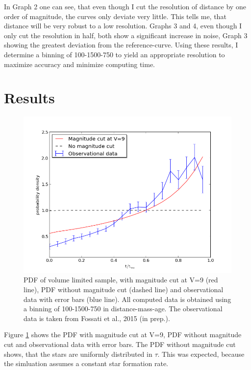 \documentclass[a4paper,10pt]{article}
\begin{document}
 In Graph 2 one can see, that even though I cut the resolution of distance by one order of magnitude, the curves only deviate very little. This
 tells me, that distance will be very robust to a low resolution. Graphs 3 and 4, even though I only cut the resolution in half, both 
 show a significant increase in noise, Graph 3 showing the greatest deviation from the reference-curve. Using these results, I determine 
 a binning of 100-1500-750 to yield an appropriate resolution to maximize accuracy and minimize computing time.
 
 \newpage
 \section{Results}
 \begin{figure}[h!]
   \includegraphics[width=\textwidth]{plot1}
   \caption{PDF of volume limited sample, with magnitude cut at V=9 (red line), PDF without magnitude cut
   (dashed line) and observational data with error bars (blue line). All computed data is obtained using a binning of 100-1500-750
   in distance-mass-age. The observational data is taken from Fossati et al., 2015 (in prep.).\label{all3}}
 \end{figure}
 
 Figure \ref{all3} shows the PDF with magnitude cut at V=9, PDF without magnitude cut and observational data with error bars.
 The PDF without magnitude cut shows, that the stars are uniformly distributed in $\tau$. This was expected,
 because the simluation assumes a constant star formation rate.\\
 
\end{document}
